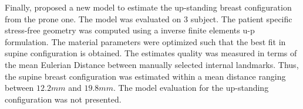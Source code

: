 Finally, \cite{eiben_surface_2016} proposed a new model to estimate the up-standing breast configuration from the prone one. The model was evaluated on 3 subject. The patient specific stress-free geometry was computed using a inverse finite elements u-p formulation. The material parameters were optimized such that the best fit in supine configuration is obtained. The estimates quality was measured in terms of the mean Eulerian Distance between manually selected internal landmarks. Thus, the supine breast configuration was estimated within a mean distance ranging between $12.2mm$ and $19.8 mm$. The model evaluation for the up-standing configuration was not presented.

    
 
 
